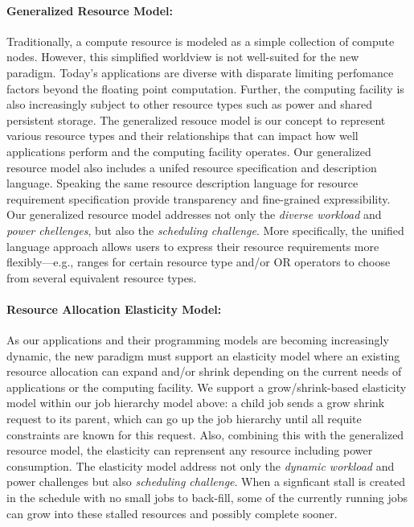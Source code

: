 \documentclass{article}
\begin{document}
\paragraph{Generalized Resource Model:}
Traditionally, a compute resource is modeled as a simple collection of compute nodes. 
However, this simplified worldview is not well-suited for the new paradigm. 
Today's applications are diverse with disparate limiting perfomance 
factors beyond the floating point computation. Further, the computing facility
is also increasingly subject to other resource types such as power
and shared persistent storage. The generalized resouce model is our concept
to represent various resource types and their relationships 
that can impact how well applications perform and the computing
facility operates. Our generalized resource model also includes a
unifed resource specification and description language. Speaking the
same resource description language for resource requirement specification 
provide transparency and fine-grained expressibility.
Our generalized resource model addresses not only the {\sl diverse workload}
and {\sl power chellenges}, but also the {\sl scheduling challenge}. More specifically, 
the unified language approach allows users to express their resource requirements
more flexibly---e.g., ranges for certain resource type and/or OR operators
to choose from several equivalent resource types. 


\paragraph{Resource Allocation Elasticity Model:}
As our applications and their programming models are becoming increasingly dynamic,
the new paradigm must support an elasticity model where an existing resource 
allocation can expand and/or shrink depending on the current needs of applications
or the computing facility. We support a grow/shrink-based elasticity
model within our job hierarchy model above: a child job sends a grow
shrink request to its parent, which can go up the job hierarchy
until all requite constraints are known for this request.  
Also, combining this with the generalized resource model, the
elasticity can reprensent any resource including power consumption. 
The elasticity model address not only the {\sl dynamic workload} and {power challenges}
but also {\sl scheduling challenge}. When a signficant stall is created
in the schedule with no small jobs to back-fill, some of the currently
running jobs can grow into these stalled resources and possibly complete sooner.  
\end{document}
